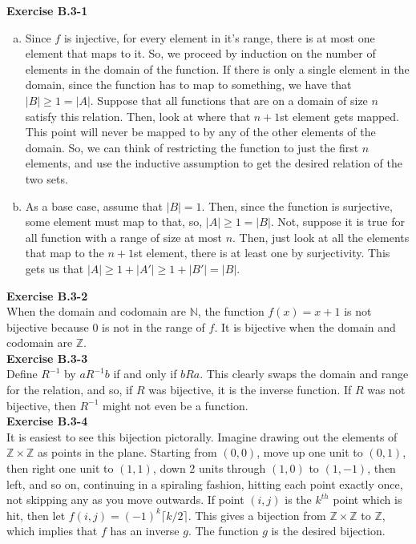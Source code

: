 \documentclass{article}
\begin{document}
\noindent\textbf{Exercise B.3-1}\\
\begin{enumerate}[a.]
\item
Since $f$ is injective, for every element in it's range, there is at most one element that maps to it. So, we proceed by induction on the number of elements in the domain of the function. If there is only a single element in the domain, since the function has to map to something, we have that $|B|\ge 1 = |A|$. Suppose that all functions that are on a domain of size $n$ satisfy this relation. Then, look at where that $n+1$st element gets mapped. This point will never be mapped to by any of the other elements of the domain. So, we can think of restricting the function to just the first $n$ elements, and use the inductive assumption to get the desired relation of the two sets.
\item
As a base case, assume that $|B|=1$. Then, since the function is surjective, some element must map to that, so, $|A|\ge 1 = |B|$. Not, suppose it is true for all function with a range of size at most $n$. Then, just look at all the elements that map to the $n+1$st element, there is at least one by surjectivity. This gets us that $|A| \ge 1 + |A'| \ge 1 + |B'| = |B|$.
\end{enumerate}

\noindent\textbf{Exercise B.3-2}\\

When the domain and codomain are $\mathbb{N}$, the function $f(x) = x+1$ is not bijective because 0 is not in the range of $f$.  It is bijective when the domain and codomain are $\mathbb{Z}$. \\


\noindent\textbf{Exercise B.3-3}\\
Define $R^{-1}$ by $a R^{-1} b$ if and only if $b R a$. This clearly swaps the domain and range for the relation, and so, if $R$ was bijective, it is the inverse function. If $R$ was not bijective, then $R^{-1}$ might not even be a function.\\

\noindent\textbf{Exercise B.3-4}\\

It is easiest to see this bijection pictorally.  Imagine drawing out the elements of $\mathbb{Z} \times \mathbb{Z}$ as points in the plane.  Starting from $(0,0)$, move up one unit to $(0,1)$, then right one unit to $(1,1)$, down 2 units through $(1,0)$ to $(1,-1)$, then left, and so on, continuing in a spiraling fashion, hitting each point exactly once, not skipping any as you move outwards.  If point $(i,j)$ is the $k^{th}$ point which is hit, then let $f(i,j) = (-1)^k\lceil k/2 \rceil$.  This gives a bijection from $\mathbb{Z} \times \mathbb{Z}$ to $\mathbb{Z}$, which implies that $f$ has an inverse $g$.  The function $g$ is the desired bijection. \\
\end{document}

